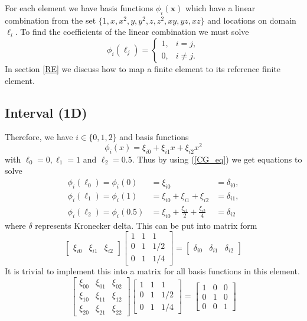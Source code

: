 \documentclass[12pt]{ociamthesis}
\begin{document}
For each element we have basis functions $\phi_i(\mathbf{x})$ which have a linear combination from the set $\{1, x, x^2, y, y^2, z, z^2, xy, yz, xz\}$ and locations on domain $\ell_i$.  To find the coefficients of the linear combination we must solve
\begin{equation} \label{CG_eq}
\phi_i(\ell_j) =
\begin{cases}
1, &i=j,\\
0, &i\neq j.
\end{cases}
\end{equation}
In section \ref{RE} we discuss how to map a finite element to its reference finite element.
\subsection{Interval (1D)}
Therefore, we have $i \in \{0, 1, 2\}$ and basis functions 
\begin{equation}
\phi_i(x) = \xi_{i0} + \xi_{i1}x + \xi_{i2}x^2
\end{equation}
with $\ell_0 = 0, \ell_1 = 1$ and $\ell_2 = 0.5$. Thus by using (\ref{CG_eq}) we get equations to solve
\begin{align}
\phi_i(\ell_0) = \phi_i(0) &= \xi_{i0} &= \delta_{i0},\\
\phi_i(\ell_1) = \phi_i(1) &= \xi_{i0} + \xi_{i1} + \xi_{i2} &= \delta_{i1},\\
\phi_i(\ell_2) = \phi_i(0.5) &= \xi_{i0} + \frac{\xi_{i1}}{2} + \frac{\xi_{i2}}{4} &= \delta_{i2}
\end{align}
where $\delta$ represents Kronecker delta. This can be put into matrix form
\begin{equation}
\left[ \begin{matrix}
\xi_{i0} & \xi_{i1} & \xi_{i2}
\end{matrix} \right]
\left[ \begin{matrix}
1 & 1 & 1 \\
0 & 1 & 1/2 \\
0 & 1 & 1/4
\end{matrix} \right] = 
\left[ \begin{matrix}
\delta_{i0} & \delta_{i1} & \delta_{i2}
\end{matrix} \right]
\end{equation}
It is trivial to implement this into a matrix for all basis functions in this element.
\begin{equation}
\left[ \begin{matrix}
\xi_{00} & \xi_{01} & \xi_{02} \\
\xi_{10} & \xi_{11} & \xi_{12} \\
\xi_{20} & \xi_{21} & \xi_{22} 
\end{matrix} \right]
\left[ \begin{matrix}
1 & 1 & 1 \\
0 & 1 & 1/2 \\
0 & 1 & 1/4
\end{matrix} \right] = 
\left[ \begin{matrix}
1 & 0 & 0 \\
0 & 1 & 0 \\
0 & 0 & 1
\end{matrix} \right]
\end{equation}
\end{document}
